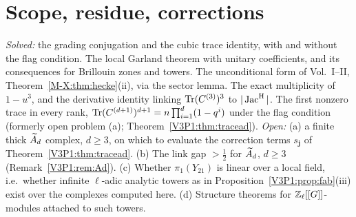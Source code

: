 \begin{table}[ht]
\centering\scriptsize
\renewcommand{\arraystretch}{1.2}
\medskip
\caption{Checks run by \texttt{code/v3p1\_verify.py}. The derivative in (D) is computed
column by column,
$\frac{d}{du}\det P=\sum_i\det\bigl(P(1)\text{ with column }i\text{ replaced by that of }P'(1)\bigr)$,
independently of the adjugate argument used in the proof.}
\label{V3P1:tab:battery}
\end{table}

\section{Scope, residue, corrections}\label{V3P1:sec:scope}

\begin{remark}\label{V3P1:rem:scope}
\emph{Solved:} the grading conjugation and the cubic trace identity, with and without the
flag condition. The local Garland theorem with unitary coefficients, and its consequences for
Brillouin zones and towers. The unconditional form of Vol.~I--II, Theorem~\ref{M-X:thm:hecke}(ii), via the
sector lemma. The exact multiplicity of $1-u^{3}$, and the derivative identity linking
$\operatorname{Tr}(C^{(3)})^{3}$ to $|\operatorname{Jac}^{\mathrm{H}}|$. The first nonzero trace in every rank,
$\operatorname{Tr}(C^{(d+1)})^{d+1}=n\prod_{i=1}^{d}(1-q^{i})$ under the flag condition (formerly open problem (a);
Theorem~\ref{V3P1:thm:tracead}). \emph{Open:} (a) a finite thick $\widetilde A_{d}$ complex, $d\ge3$, on which
to evaluate the correction terms $s_{\mathbf j}$ of Theorem~\ref{V3P1:thm:tracead}. (b) The link gap $>\tfrac12$ for $\widetilde A_{d}$, $d\ge3$ (Remark~\ref{V3P1:rem:Ad}). (c) Whether
$\pi_1(Y_{21})$ is linear over a local field, i.e.\ whether infinite $\ell$-adic analytic
towers as in Proposition~\ref{V3P1:prop:fab}(iii) exist over the complexes computed here.
(d) Structure theorems for $\mathbb{Z}_\ell[[G]]$-modules attached to such towers.
\end{remark}


